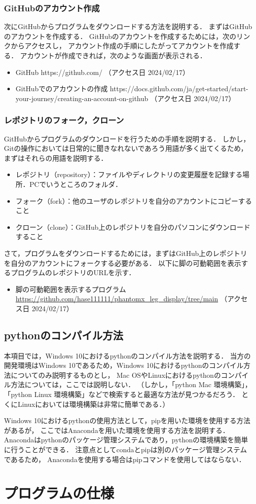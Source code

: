 \subsubsection{GitHubのアカウント作成}
次にGitHubからプログラムをダウンロードする方法を説明する．
まずはGitHubのアカウントを作成する．
GitHubのアカウントを作成するためには，次のリンクからアクセスし，
アカウント作成の手順にしたがってアカウントを作成する．
アカウントが作成できれば，次のような画面が表示される．

\begin{itemize}
  \item GitHub https://github.com/ （アクセス日 2024/02/17）
  \item GitHubでのアカウントの作成 https://docs.github.com/ja/get-started/start-your-journey/creating-an-account-on-github （アクセス日 2024/02/17）
\end{itemize}

\subsubsection{レポジトリのフォーク，クローン}
GitHubからプログラムのダウンロードを行うための手順を説明する．
しかし，Gitの操作においては日常的に聞きなれないであろう用語が多く出てくるため，
まずはそれらの用語を説明する．
\begin{itemize}
  \item レポジトリ（repository）：ファイルやディレクトリの変更履歴を記録する場所．PCでいうところのフォルダ．
  \item フォーク（fork）：他のユーザのレポジトリを自分のアカウントにコピーすること
  \item クローン（clone）：GitHub上のレポジトリを自分のパソコンにダウンロードすること
\end{itemize}

さて，プログラムをダウンロードするためには，まずはGitHub上のレポジトリを自分のアカウントにフォークする必要がある．
以下に脚の可動範囲を表示するプログラムのレポジトリのURLを示す．

\begin{itemize}
  \item 脚の可動範囲を表示するプログラム \url{https://github.com/hase111111/phantomx_leg_display/tree/main} （アクセス日 2024/02/17）
\end{itemize}

\subsection{pythonのコンパイル方法}
本項目では，Windows 10におけるpythonのコンパイル方法を説明する．
当方の開発環境はWindows 10であるため，Windows 10におけるpythonのコンパイル方法についてのみ説明するものとし，
Mac OSやLinuxにおけるpythonのコンパイル方法については，ここでは説明しない．
（しかし，「python Mac 環境構築」，「python Linux 環境構築」などで検索すると最適な方法が見つかるだろう．
とくにLinuxにおいては環境構築は非常に簡単である．）

Windows 10におけるpythonの使用方法として，pipを用いた環境を使用する方法があるが，
ここではAnacondaを用いた環境を使用する方法を説明する．
Anacondaはpythonのパッケージ管理システムであり，pythonの環境構築を簡単に行うことができる．
注意点としてcondaとpipは別のパッケージ管理システムであるため，
Anacondaを使用する場合はpipコマンドを使用してはならない．

\section{プログラムの仕様}

